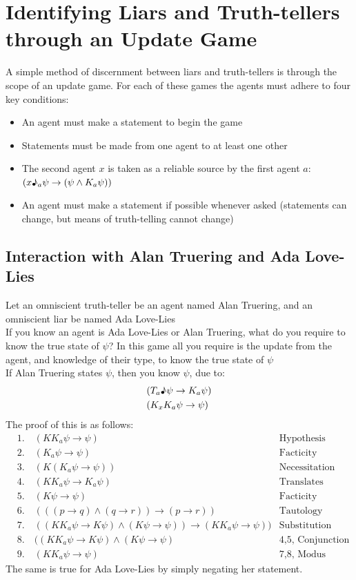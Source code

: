 \documentclass[12pt, titlepage, twoside, a4paper]{report}
\begin{document}
{\section{Identifying Liars and Truth-tellers through an Update Game}
A simple method of discernment between liars and truth-tellers is through the scope of an update game. For each of these games the agents must adhere to four key conditions:
\begin{itemize}
\item An agent must make a statement to begin the game
\item Statements must be made from one agent to at least one other
\item The second agent $x$ is taken as a reliable source by the first agent $a$:\\
$(x\text{\textmusicalnote}_a \psi \to (\psi \wedge K_a \psi))$
\item An agent must make a statement if possible whenever asked (statements can change, but means of truth-telling cannot change)
\end{itemize}

\subsection{Interaction with Alan Truering and Ada Love-Lies}
Let an omniscient truth-teller be an agent named Alan Truering, and an omniscient liar be named Ada Love-Lies\\
If you know an agent is Ada Love-Lies or Alan Truering, what do you require to know the true state of $\psi$? In this game all you require is the update from the agent, and knowledge of their type, to know the true state of $\psi$\\
If Alan Truering states $\psi$, then you know $\psi$, due to:
\begin{align*}
&(T_a \text{\textmusicalnote} \psi \to K_a \psi)\\
&(K_x K_a \psi \to \psi)
\end{align*}
The proof of this is as follows:
\begin{align*}
&1. \quad (KK_a \psi \to \psi) \quad \quad 											&\text{Hypothesis}\\
&2. \quad (K_a \psi \to \psi) 														&\text{Facticity}\\
&3. \quad (K(K_a \psi \to \psi)) 													&\text{Necessitation}\\
&4. \quad (KK_a \psi \to K_a \psi) 													&\text{Translates across implication}\\
&5. \quad (K \psi \to \psi) 															&\text{Facticity}\\
&6. \quad (((p \to q) \wedge (q \to r)) \to (p \to r)) 								&\text{Tautology}\\
&7. \quad ((KK_a \psi \to K \psi) \wedge (K \psi \to \psi)) \to (KK_a \psi \to \psi)) 	&\text{Substitution}\\
&8. \quad ((KK_a \psi \to K \psi) \wedge (K \psi \to \psi) 							&\text{4,5, Conjunction}\\
&9. \quad (KK_a \psi \to \psi) &\text{7,8, Modus Ponens}
\end{align*}
The same is true for Ada Love-Lies by simply negating her statement.

}
\end{document}
